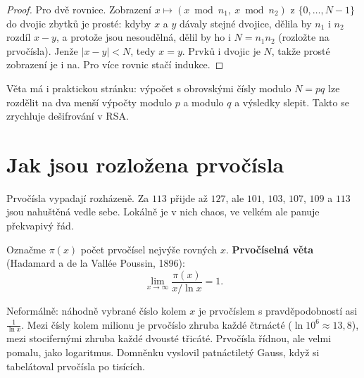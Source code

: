 \begin{proof}
  Pro dvě rovnice. Zobrazení $x\mapsto(x\bmod n_1,\ x\bmod n_2)$ z $\{0, \ldots, N - 1\}$ do dvojic zbytků je prosté: kdyby $x$ a $y$ dávaly stejné dvojice, dělila by $n_1$ i $n_2$ rozdíl $x - y$, a protože jsou nesoudělná, dělil by ho i $N = n_1n_2$ (rozložte na prvočísla). Jenže $|x - y| < N$, tedy $x = y$. Prvků i dvojic je $N$, takže prosté zobrazení je i na. Pro více rovnic stačí indukce.
\end{proof}

Věta má i praktickou stránku: výpočet s obrovskými čísly modulo $N = pq$ lze rozdělit na dva menší výpočty modulo $p$ a modulo $q$ a výsledky slepit. Takto se zrychluje dešifrování v RSA.

\section{Jak jsou rozložena prvočísla}

Prvočísla vypadají rozházeně. Za $113$ přijde až $127$, ale $101$, $103$, $107$, $109$ a $113$ jsou nahuštěná vedle sebe. Lokálně je v nich chaos, ve velkém ale panuje překvapivý řád.

\begin{definitionbox}
  Označme $\pi(x)$ počet prvočísel nejvýše rovných $x$. \textbf{Prvočíselná věta} (Hadamard a de la Vallée Poussin, 1896):
  \begin{equation*}
    \lim_{x\to\infty}\frac{\pi(x)}{x/\ln x} = 1.
  \end{equation*}
\end{definitionbox}

Neformálně: náhodně vybrané číslo kolem $x$ je prvočíslem s pravděpodobností asi $\frac{1}{\ln x}$. Mezi čísly kolem milionu je prvočíslo zhruba každé čtrnácté ($\ln 10^6\approx 13{,}8$), mezi stocifernými zhruba každé dvousté třicáté. Prvočísla řídnou, ale velmi pomalu, jako logaritmus. Domněnku vyslovil patnáctiletý Gauss, když si tabelátoval prvočísla po tisících.

